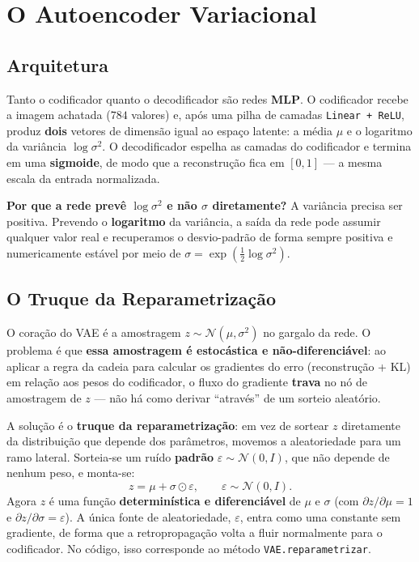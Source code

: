 \documentclass[11pt,a4paper]{article}
\begin{document}
\section{O Autoencoder Variacional}

\subsection{Arquitetura}
Tanto o codificador quanto o decodificador são redes \textbf{MLP}. O codificador recebe a imagem achatada ($784$ valores) e, após uma pilha de camadas \texttt{Linear + ReLU}, produz \textbf{dois} vetores de dimensão igual ao espaço latente: a média $\mu$ e o logaritmo da variância $\log\sigma^2$. O decodificador espelha as camadas do codificador e termina em uma \textbf{sigmoide}, de modo que a reconstrução fica em $[0,1]$ --- a mesma escala da entrada normalizada.

\textbf{Por que a rede prevê $\log\sigma^2$ e não $\sigma$ diretamente?} A variância precisa ser positiva. Prevendo o \textbf{logaritmo} da variância, a saída da rede pode assumir qualquer valor real e recuperamos o desvio-padrão de forma sempre positiva e numericamente estável por meio de $\sigma = \exp(\tfrac{1}{2}\log\sigma^2)$.

\subsection{O Truque da Reparametrização}
\label{sec:reparam}
O coração do VAE é a amostragem $z \sim \mathcal{N}(\mu, \sigma^2)$ no gargalo da rede. O problema é que \textbf{essa amostragem é estocástica e não-diferenciável}: ao aplicar a regra da cadeia para calcular os gradientes do erro (reconstrução + KL) em relação aos pesos do codificador, o fluxo do gradiente \textbf{trava} no nó de amostragem de $z$ --- não há como derivar ``através'' de um sorteio aleatório.

A solução é o \textbf{truque da reparametrização}: em vez de sortear $z$ diretamente da distribuição que depende dos parâmetros, movemos a aleatoriedade para um ramo lateral. Sorteia-se um ruído \textbf{padrão} $\varepsilon \sim \mathcal{N}(0, I)$, que não depende de nenhum peso, e monta-se:
\begin{equation}
    z = \mu + \sigma \odot \varepsilon, \qquad \varepsilon \sim \mathcal{N}(0, I).
\end{equation}
Agora $z$ é uma função \textbf{determinística e diferenciável} de $\mu$ e $\sigma$ (com $\partial z/\partial\mu = 1$ e $\partial z/\partial\sigma = \varepsilon$). A única fonte de aleatoriedade, $\varepsilon$, entra como uma constante sem gradiente, de forma que a retropropagação volta a fluir normalmente para o codificador. No código, isso corresponde ao método \texttt{VAE.reparametrizar}.
\end{document}
